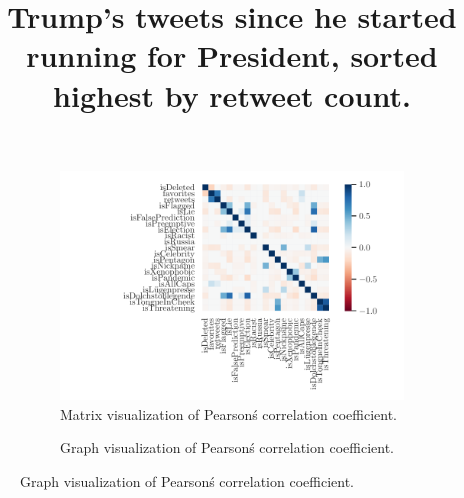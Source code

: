 \documentclass{article}
\begin{document}
    \title{Trump's tweets since he started running for President, sorted highest by retweet count.}
    \begin{figure}
         \vspace{-3cm}
         \begin{subfigure}{\textwidth}
             \hspace{-3.05cm}
             \includegraphics{corr_heatmap.pdf}
             \caption{Matrix visualization of Pearson\'s correlation coefficient.}
         \end{subfigure}

         \begin{subfigure}{\textwidth}
             \hspace{-1cm}
             
             \caption{Graph visualization of Pearson\'s correlation coefficient.}
         \end{subfigure}
    \end{figure}
\end{document}
